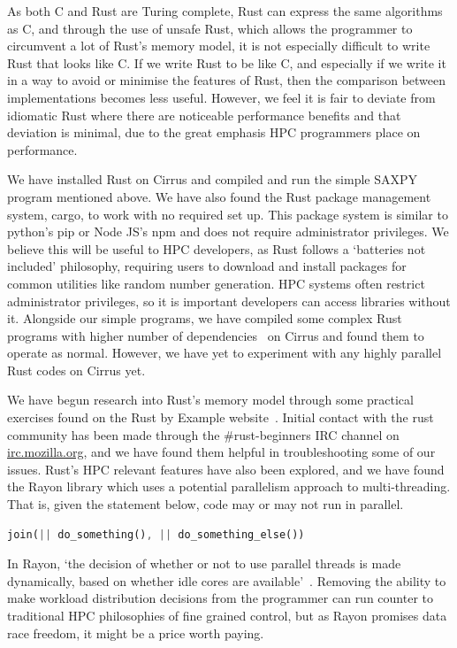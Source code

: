 \documentclass{report}[a4]
\begin{document}
As both C and Rust are Turing complete, Rust can express the same algorithms as C, and through the use of unsafe Rust, which allows the programmer to circumvent a lot of Rust's memory model, it is not especially difficult to write Rust that looks like C. If we write Rust to be like C, and especially if we write it in a way to avoid or minimise the features of Rust, then the comparison between implementations becomes less useful. However, we feel it is fair to deviate from idiomatic Rust where there are noticeable performance benefits and that deviation is minimal, due to the great emphasis HPC programmers place on performance.

We have installed Rust on Cirrus and compiled and run the simple SAXPY program mentioned above. We have also found the Rust package management system, cargo, to work with no required set up. This package system is similar to python's pip or Node JS's npm and does not require administrator privileges. We believe this will be useful to HPC developers, as Rust follows a `batteries not included' philosophy, requiring users to download and install packages for common utilities like random number generation. HPC systems often restrict administrator privileges, so it is important developers can access libraries without it. Alongside our simple programs, we have compiled some complex Rust programs with higher number of dependencies~\cite{Bat,Exa} on Cirrus and found them to operate as normal. However, we have yet to experiment with any highly parallel Rust codes on Cirrus yet.

We have begun research into Rust's memory model through some practical exercises found on the Rust by Example website~\cite{rustbyexample}. Initial contact with the rust community has been made through the \#rust-beginners IRC channel on \url{irc.mozilla.org}, and we have found them helpful in troubleshooting some of our issues. Rust's HPC relevant features have also been explored, and we have found the Rayon library which uses a potential parallelism approach to multi-threading. That is, given the statement below, code may or may not run in parallel.

\begin{lstlisting}[language=Rust]
join(|| do_something(), || do_something_else())
\end{lstlisting}

In Rayon, `the decision of whether or not to use parallel threads is made dynamically, based on whether idle cores are available'~\cite{rayon}. Removing the ability to make workload distribution decisions from the programmer can run counter to traditional HPC philosophies of fine grained control, but as Rayon promises data race freedom, it might be a price worth paying.
\end{document}
